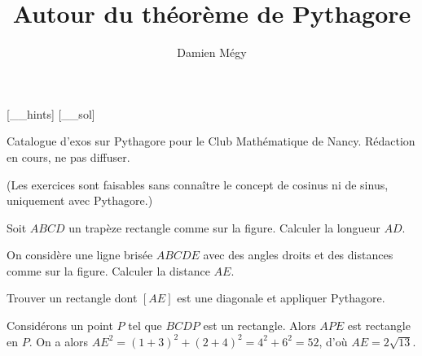 





[_\jobname_hints]
[_\jobname_sol]


\title{Autour du théorème de Pythagore}
\author{Damien Mégy}
\maketitle

Catalogue d'exos sur Pythagore pour le Club Mathématique de Nancy. Rédaction en cours, ne pas diffuser.


(Les exercices sont faisables sans connaître le concept de cosinus ni de sinus, uniquement avec Pythagore.)

\begin{exo}
Soit $ABCD$ un trapèze rectangle comme sur la figure.
Calculer la longueur $AD$.
\begin{center}
\end{center}
\end{exo}

\begin{exo}
On considère une ligne brisée $ABCDE$ avec des angles droits et des distances comme sur la figure.
Calculer la distance $AE$.
\begin{center}
\end{center}
\begin{hint}
Trouver un rectangle dont $[AE]$ est une diagonale et appliquer Pythagore.
\end{hint}
\begin{sol}
Considérons un point $P$ tel que $BCDP$ est un rectangle. Alors $APE$ est rectangle en $P$.
On a alors $AE^2 = (1+3)^2+(2+4)^2=4^2+6^2=52$, d'où $AE=2\sqrt{13}$.
\end{sol}
\end{exo}

